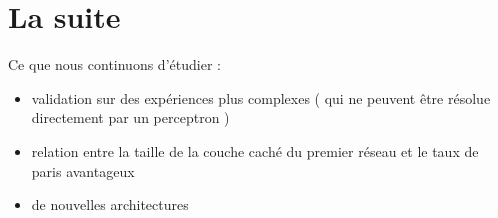 \documentclass[a4paper,12pt]{article}
\begin{document}
\section{La suite}

Ce que nous continuons d'étudier : 
\begin{itemize}
 \item validation sur des expériences plus complexes ( qui ne peuvent être résolue directement par un perceptron )
 \item relation entre la taille de la couche caché du premier réseau et le taux de paris avantageux
 \item de nouvelles architectures
\end{itemize}
\end{document}
